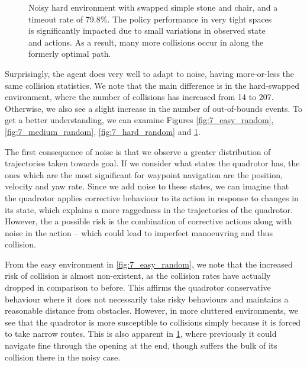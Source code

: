 \begin{figure}[htb]
    \centering
    \caption{Noisy hard environment with swapped simple stone and chair, and a timeout rate of 79.8\%. The policy performance in very tight spaces is significantly impacted due to small variations in observed state and actions. As a result, many more collisions occur in along the formerly optimal path.}
    \label{fig:7_hard_swapped_random}
\end{figure}

Surprisingly, the agent does very well to adapt to noise, having more-or-less the same collision statistics. We note that the main difference is in the hard-swapped environment, where the number of collisions has increased from 14 to 207. Otherwise, we also see a slight increase in the number of out-of-bounds events. To get a better understanding, we can examine Figures \ref{fig:7_easy_random}, \ref{fig:7_medium_random}, \ref{fig:7_hard_random} and \ref{fig:7_hard_swapped_random}.

The first consequence of noise is that we observe a greater distribution of trajectories taken towards goal. If we consider what states the quadrotor has, the ones which are the most significant for waypoint navigation are the position, velocity and yaw rate. Since we add noise to these states, we can imagine that the quadrotor applies corrective behaviour to its action in response to changes in its state, which explains a more raggedness in the trajectories of the quadrotor. However, the a possible risk is the combination of corrective actions along with noise in the action -- which could lead to imperfect manoeuvring and thus collision.  

From the easy environment in \cref{fig:7_easy_random}, we note that the increased risk of collision is almost non-existent, as the collision rates have actually dropped in comparison to before. This affirms the quadrotor conservative behaviour where it does not necessarily take risky behaviours and maintains a reasonable distance from obstacles. However, in more cluttered environments, we see that the quadrotor is more susceptible to collisions simply because it is forced to take narrow routes. This is also apparent in \cref{fig:7_hard_swapped_random}, where previously it could navigate fine through the opening at the end, though suffers the bulk of its collision there in the noisy case.


